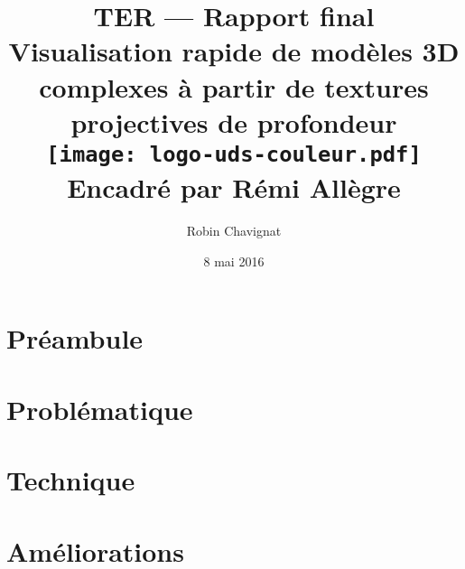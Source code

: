 \documentclass[12pt,twoside]{report}
\begin{document}
\title{
    {TER --- Rapport final}\\
    {Visualisation rapide de modèles 3D complexes à partir de textures projectives de profondeur}\\
    {\texttt{[image: logo-uds-couleur.pdf]}}\\ %
    {Encadré par Rémi Allègre}
}
\author{Robin Chavignat}
\date{8 mai 2016}
\maketitle
\renewcommand*\contentsname{Table des matières}
\renewcommand{\chaptername}{}
\tableofcontents

\chapter{Préambule}



\chapter{Problématique}



\chapter{Technique}



\chapter{Améliorations}





\end{document}
